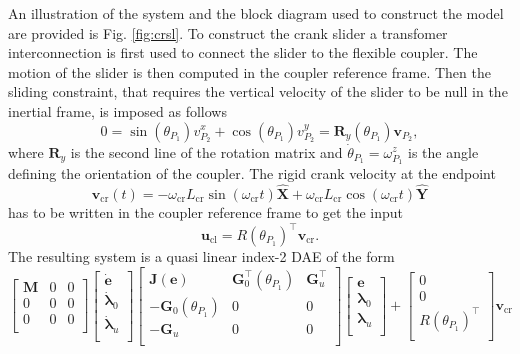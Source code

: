\documentclass{svjour3}                     %
\begin{document}
An illustration of the system and the block diagram used to construct the model are provided is Fig. \ref{fig:crsl}. To construct the crank slider a transfomer interconnection is first used to connect the slider to the flexible coupler. The motion of the slider is then computed in the coupler reference frame. Then the sliding constraint, that requires the vertical velocity of the slider to be null in the inertial frame, is imposed as follows
\[
0 = \sin(\theta_{P_1}) v^x_{P_2} + \cos(\theta_{P_1}) v^y_{P_2} = \bm{R}_y(\theta_{P_1}) \bm{v}_{P_2},
\]
where $\bm{R}_y$ is the second line of the rotation matrix and $\dot{\theta}_{P_1} = \omega_{P_1}^z$ is the angle defining the orientation of the coupler. The rigid crank velocity at the endpoint  
\begin{equation*}
\bm{v}_{\text{cr}}(t) = -\omega_{\text{cr}} L _{\text{cr}} \sin(\omega_{\text{cr}} t) \widehat{\bm{X}} + \omega_{\text{cr}} L _{\text{cr}} \cos(\omega_{\text{cr}} t) \widehat{\bm{Y}}
\end{equation*} 
has to be written in the coupler reference frame to get the input
\begin{equation}
\bm{u}_{\text{cl}} = R(\theta_{P_1})^\top \bm{v}_{\text{cr}}.
\end{equation}
The resulting system is a quasi linear index-2 DAE of the form
\begin{equation*}
\begin{bmatrix}
\bm{M} & 0 & 0 \\
0 & 0 & 0 \\
0 & 0 & 0 \\
\end{bmatrix}
\begin{bmatrix}
\dot{\bm{e}} \\ \dot{\bm{\lambda}}_0 \\ \dot{\bm{\lambda}}_u \\
\end{bmatrix}
\begin{bmatrix}
\bm{J}(\bm{e}) & \bm{G}_0^\top(\theta_{P_1}) & \bm{G}_u^\top \\
-\bm{G}_0(\theta_{P_1}) & 0 & 0 \\
-\bm{G}_u & 0 & 0 \\
\end{bmatrix}
\begin{bmatrix}
\bm{e} \\ \bm{\lambda}_0 \\ \bm{\lambda}_u \\
\end{bmatrix} + 
\begin{bmatrix}
0 \\ 0 \\ R(\theta_{P_1})^\top \\
\end{bmatrix}
\bm{v}_{\text{cr}}
\end{equation*}
\end{document}

